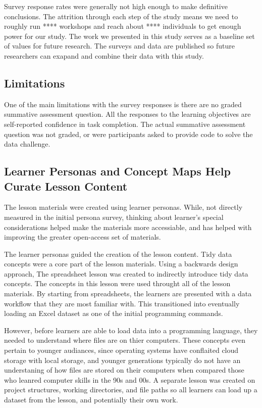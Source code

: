 \documentclass[030-workshop.tex]{subfiles}
\begin{document}
    Survey response rates were generally not high enough to make definitive conclusions.
    The attrition through each step of the study means we need to roughly run ****
    workshops and reach about **** individuals to get enough power for our study.
    The work we presented in this study serves as a baseline set of values for future research.
    The surveys and data are published so future researchers can exapand and combine their
    data with this study.

    \subsection{Limitations}

        One of the main limitations with the survey responses is there
        are no graded summative assessment question.
        All the responses to the learning objectives are self-reported confidence in task completion.
        The actual summative assessment question was not graded,
        or were participants asked to provide code to solve the data challenge.

    \subsection{Learner Personas and Concept Maps Help Curate Lesson Content}

        The lesson materials were created using learner personas.
        While, not directly measured in the initial persona survey,
        thinking about learner's special considerations helped make the materials
        more accessiable,
        and has helped with improving the greater open-access set of materials.

        The learner personas guided the creation of the lesson content.
        Tidy data concepts were a core part of the lesson materials.
        Using a backwards design approach,
        The spreadsheet lesson was created to indirectly introduce tidy data concepts.
        The concepts in this lesson were used throught all of the lesson materials.
        By starting from spreadsheets,
        the learners are presented with a data workflow that they are most familiar with.
        This transitioned into eventually loading an Excel dataset as one of the initial programming commands.

        However, before learners are able to load data into a programming language,
        they needed to understand where files are on thier computers.
        These concepts even pertain to younger audiances,
        since operating systems have conflaited cloud storage with local storage,
        and younger generations typically do not have an understaning of how files are stored on their computers
        when compared those who leanred computer skills in the 90s and 00s. %
        A separate lesson was created on project structures, working directories, and file paths
        so all learners can load up a dataset from the lesson, and potentially their own work.
\end{document}
